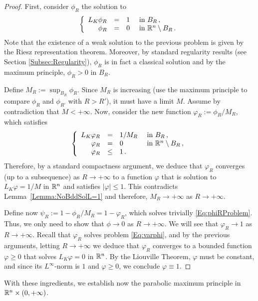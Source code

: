 \begin{proof}
	First, consider $\phi_R$ the solution to
	\begin{equation}
	\label{Eq:phiRProblem}
	\left\{\begin{array}{rcll}
	L_K  \phi_R &=& 1 & \textrm{ in } B_R\,,\\
	\phi_R &=& 0 & \textrm{ in } \mathbb{R}^n\setminus B_R\,.
	\end{array} \right.
	\end{equation}
	Note that the existence of a weak solution to the previous problem is given by the Riesz representation theorem. Moreover, by standard regularity results (see Section \ref{Subsec:Regularity}), $\phi_R$ is in fact a classical solution and by the maximum principle, $\phi_R>0$ in $B_R$.
	
	Define $M_R := \sup_{B_R} \phi_R$. Since $M_R$ is increasing (use the maximum principle to compare $\phi_R$ and $\phi_{R'}$ with $R>R'$), it must have a limit $M$. Assume by contradiction that $M<+\infty$. Now, consider the new function $ \varphi_R := \phi_R/M_R$, which satisfies
	\begin{equation}
	\label{Eq:varphi}
	\left\{\begin{array}{rcll}
	L_K  \varphi_R &=& 1/M_R & \textrm{ in } B_R\,,\\
	\varphi_R &=& 0 & \textrm{ in } \mathbb{R}^n\setminus B_R\,, \\
	\varphi_R &\leq & 1\,.
	\end{array} \right.
	\end{equation}
	Therefore, by a standard compactness argument, we deduce that $\varphi_R$ converges (up to a subsequence) as $R\to +\infty$ to a function $\varphi$ that is solution to $L_K  \varphi = 1/M$ in $\mathbb{R}^n$ and satisfies  $|\varphi| \leq 1$. This contradicts Lemma~\ref{Lemma:NoBddSolL=1} and therefore, $M_R \to +\infty$ as $R\to +\infty$. 
	
	Define now $\psi_R := 1-\phi_R/M_R = 1-\varphi_R$, which solves trivially \eqref{Eq:phiRProblem}. Thus, we only need to show that $\phi \to 0$ as $R\to +\infty$. We will see that $\varphi_R \to	1$ as $R\to +\infty$. Recall that $\varphi_R$ solves problem \eqref{Eq:varphi}, and by the previous 	arguments, letting $R\to +\infty$ we deduce that $\varphi_R$ converges to a bounded function $\varphi\geq 0$ that solves $ L_K \varphi = 0 $ in $\mathbb{R}^n$. By the Liouville Theorem, $\varphi$ must be constant, and since its $L^\infty$-norm is $1$ and $\varphi\geq 0$, we conclude $\varphi\equiv 1$.	
\end{proof}

With these ingredients, we establish now the parabolic maximum principle in $\mathbb{R}^n \times (0,+\infty)$. 

